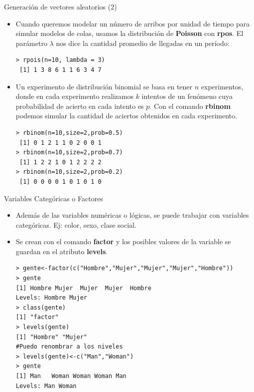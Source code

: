 \documentclass[handout]{beamer}
\begin{document}
\begin{frame}[fragile]{Generación de vectores aleatorios (2)}
\scriptsize{
\begin{itemize}
 \item Cuando queremos modelar un número de arribos por unidad de tiempo para simular modelos de colas, usamos la distribución de \textbf{Poisson} con \textbf{rpos}. El parámetro $\lambda$ nos dice la cantidad promedio de llegadas en un período:
 \begin{verbatim}
> rpois(n=10, lambda = 3)
 [1] 1 3 8 6 1 1 6 3 4 7
 \end{verbatim}

 \item Un experimento de distribución binomial se basa en tener $n$ experimentos, donde en cada experimento  realizamos $k$ intentos de un fenómeno cuya probabilidad de acierto en cada intento es $p$. Con el comando \textbf{rbinom} podemos simular la cantidad de aciertos obtenidos en cada experimento.
\begin{verbatim}
> rbinom(n=10,size=2,prob=0.5)
 [1] 0 1 2 1 1 0 2 0 0 1
> rbinom(n=10,size=2,prob=0.7)
 [1] 1 2 2 1 0 1 2 2 2 2
> rbinom(n=10,size=2,prob=0.2)
 [1] 0 0 0 0 1 0 1 0 1 0 
\end{verbatim}

 
 
\end{itemize}


}
\end{frame}


\begin{frame}[fragile]{Variables Categóricas o Factores}
\scriptsize{
\begin{itemize}
 \item Además de las variables numéricas o lógicas, se puede trabajar con variables categóricas. Ej: color, sexo, clase social.
 \item Se crean con el comando \textbf{factor} y los posibles valores de la variable se guardan en el atributo \textbf{levels}.
\begin{verbatim}
> gente<-factor(c("Hombre","Mujer","Mujer","Mujer","Hombre"))
> gente
[1] Hombre Mujer  Mujer  Mujer  Hombre
Levels: Hombre Mujer
> class(gente)
[1] "factor"
> levels(gente)
[1] "Hombre" "Mujer" 
#Puedo renombrar a los niveles
> levels(gente)<-c("Man","Woman")
> gente
[1] Man   Woman Woman Woman Man  
Levels: Man Woman
\end{verbatim}
 
\end{itemize}

}
\end{frame}
\end{document}
